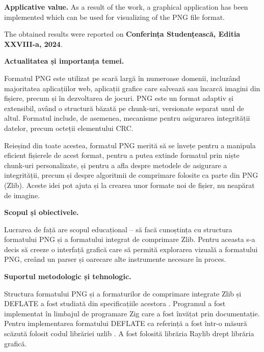 \documentclass[a4paper,12pt]{report}
\newcommand{\conferencesList}{Conferința Studențească, Editia XXVIII-a, 2024}
\begin{document}
\textbf{Applicative value.} 
As a result of the work, a graphical application has been implemented which can be used for visualizing of the \ac{PNG} file format.

The obtained results were reported on \textbf{\conferencesList}\cite{self}.



\textbf{Actualitatea și importanța temei.}

Formatul \ac{PNG} este utilizat pe scară largă în numeroase domenii, incluzând majoritatea aplicațiilor
web, aplicații grafice care salvează sau încarcă imagini din fișiere, precum și în dezvoltarea de jocuri.
\ac{PNG} este un format adaptiv și extensibil, având o structură băzată pe chunk-uri, versionate separat unul
de altul. Formatul include, de asemenea, mecanisme pentru asigurarea integrității datelor, precum
octeții elementului \ac{CRC}.

Reieșind din toate acestea, formatul \ac{PNG} merită să se învețe pentru a manipula eficient fișierele de
acest format, pentru a putea extinde formatul prin niște chunk-uri personalizate, și pentru a afla despre
metodele de asigurare a integrității, precum și despre algoritmii de comprimare folosite ca parte din \ac{PNG}
(Zlib). Aceste idei pot ajuta și la crearea unor formate noi de fișier, nu neapărat de imagine.

\textbf{Scopul și obiectivele.}

Lucrarea de față are scopul educațional -- să facă cunoștința cu structura formatului \ac{PNG} și a
formatului integrat de comprimare \ac{Zlib}.
Pentru aceasta s-a decis să creeze o interfață grafică care
să permită explorarea vizuală a formatului \ac{PNG},
creând un parser și oarecare alte instrumente necesare în proces.


\textbf{Suportul metodologic și tehnologic.}

Structura formatului \ac{PNG} și a formaturilor de comprimare integrate Zlib și DEFLATE
a fost studiată din specificațiile acestora \cite{png_spec} \cite{zlib_spec} \cite{deflate_spec}.
Programul a fost implementat în limbajul de programare Zig \cite{zig} care a fost învățat prin documentație.
Pentru implementarea formatului DEFLATE ca referință a fost într-o măsură scăzută folosit codul librăriei uzlib \cite{gzip_impl}.
A fost folosită librăria Raylib \cite{raylib} drept librăria grafică.
\end{document}
